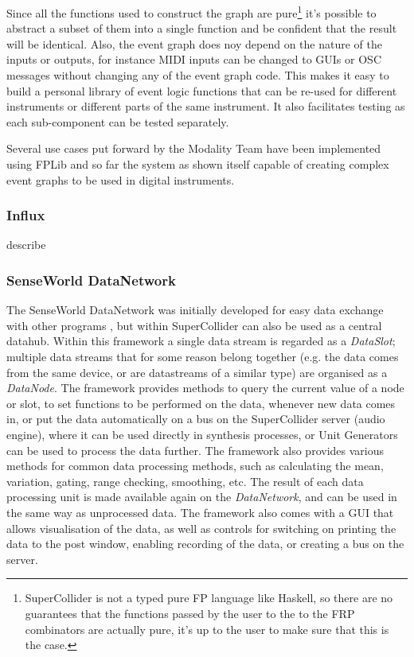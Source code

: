 \documentclass{article}
\begin{document}
Since all the functions used to construct the graph are pure\footnote{SuperCollider is not a typed pure FP language like Haskell, so there are no guarantees that the functions passed by the user to the to the FRP combinators are actually pure, it's up to the user to make sure that this is the case.} it's possible to abstract a subset of them into a single function and be confident that the result will be identical. Also, the event graph does noy depend on the nature of the inputs or outputs, for instance MIDI inputs can be changed to GUIs or OSC messages without changing any of the event graph code. This makes it easy to build a personal library of event logic functions that can be re-used for different instruments or different parts of the same instrument. It also facilitates testing as each sub-component can be tested separately.

Several use cases put forward by the Modality Team have been implemented using FPLib and so far the system as shown itself capable of creating complex event graphs to be used in digital instruments.

\subsubsection{Influx}

describe


\subsubsection{SenseWorld DataNetwork}

The SenseWorld DataNetwork was initially developed for easy data exchange with other programs \cite{Baalman2010}, but within SuperCollider can also be used as a central datahub. Within this framework a single data stream is regarded as a \emph{DataSlot}; multiple data streams that for some reason belong together (e.g. the data comes from the same device, or are datastreams of a similar type) are organised as a \emph{DataNode}. The framework provides methods to query the current value of a node or slot, to set functions to be performed on the data, whenever new data comes in, or put the data automatically on a bus on the SuperCollider server (audio engine), where it can be used directly in synthesis processes, or Unit Generators can be used to process the data further.
The framework also provides various methods for common data processing methods, such as calculating the mean, variation, gating, range checking, smoothing, etc. The result of each data processing unit is made available again on the \emph{DataNetwork}, and can be used in the same way as unprocessed data. The framework also comes with a GUI that allows visualisation of the data, as well as controls for switching on printing the data to the post window, enabling recording of the data, or creating a bus on the server.
\end{document}
